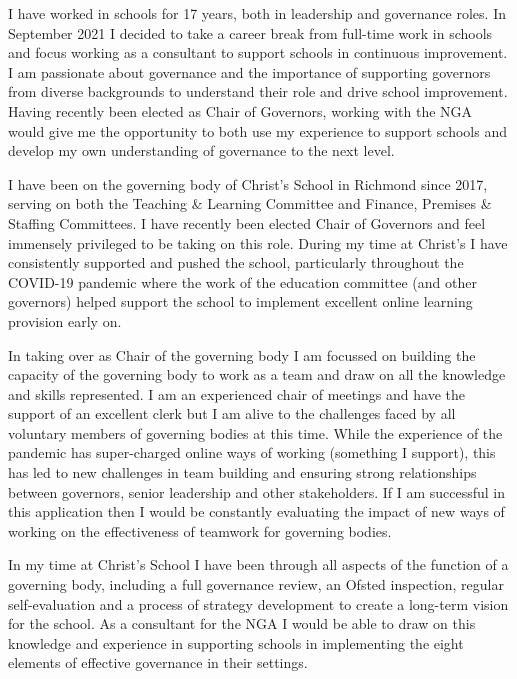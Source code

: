 I have worked in schools for 17 years, both in leadership and governance roles. In September 2021 I decided to take a career break from full-time work in schools and focus working as a consultant to support schools in continuous improvement. I am passionate about governance and the importance of supporting governors from diverse backgrounds to understand their role and drive school improvement. Having recently been elected as Chair of Governors, working with the NGA would give me the opportunity to both use my experience to support schools and develop my own understanding of governance to the next level.

I have been on the governing body of Christ's School in Richmond since 2017, serving on both the Teaching \& Learning Committee and Finance, Premises \& Staffing Committees. I have recently been elected Chair of Governors and feel immensely privileged to be taking on this role. During my time at Christ's I have consistently supported and pushed the school, particularly throughout the COVID-19 pandemic where the work of the education committee (and other governors) helped support the school to implement excellent online learning provision early on. 

In taking over as Chair of the governing body I am focussed on building the capacity of the governing body to work as a team and draw on all the knowledge and skills represented. I am an experienced chair of meetings and have the support of an excellent clerk but I am alive to the challenges faced by all voluntary members of governing bodies at this time. While the experience of the pandemic has super-charged online ways of working (something I support), this has led to new challenges in team building and ensuring strong relationships between governors, senior leadership and other stakeholders. If I am successful in this application then I would be constantly evaluating the impact of new ways of working on the effectiveness of teamwork for governing bodies.

In my time at Christ's School I have been through all aspects of the function of a governing body, including a full governance review, an Ofsted inspection, regular self-evaluation and a process of strategy development to create a long-term vision for the school. As a consultant for the NGA I would be able to draw on this knowledge and experience in supporting schools in implementing the eight elements of effective governance in their settings.


